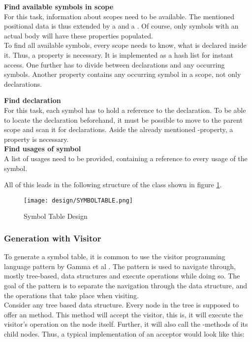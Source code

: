 \textbf{Find available symbols in scope}\\
For this task, information about scopes need to be available.
The mentioned positional data is thus extended by a  and a .
Of course, only symbols with an actual body will have these properties populated.\\

To find all available symbols, every scope needs to know, what is declared inside it.
Thus, a property  is necessary.
It is implemented as a hash list for instant access.
One further has to divide between declarations and any occurring symbols.
Another property  contains any occurring symbol in a scope, not only declarations.

\textbf{Find declaration}\\
For this task, each symbol has to hold a reference to the declaration.
To be able to locate the declaration beforehand, it must be possible to move to the parent scope and scan it for declarations.
Aside the already mentioned -property, a   property is necessary. \\

\textbf{Find usages of symbol}\\
A list of usages need to be provided, containing a reference to every usage of the symbol.

All of this leads in the following structure of the class  shown in figure \ref{fig:symboltabledesign}.

\begin{figure}[h]
    \centering
    \texttt{[image: design/SYMBOLTABLE.png]}
    \caption{Symbol Table Design}
    \label{fig:symboltabledesign}
\end{figure}


\subsubsection{Generation with Visitor}
To generate a symbol table, it is common to use the visitor programming language pattern by Gamma et al \cite{gofBook}.
The pattern is used to navigate through, mostly tree-based, data structures and execute operations while doing so.
The goal of the pattern is to separate the navigation through the data structure, and the operations that take place when visiting.\\

Consider any tree based data structure.
Every node in the tree is supposed to offer an  method.
This method will accept the visitor, this is, it will execute the visitor's operation on the node itself.
Further, it will also call the -methods of its child nodes.
Thus, a typical implementation of an acceptor would look like this:

